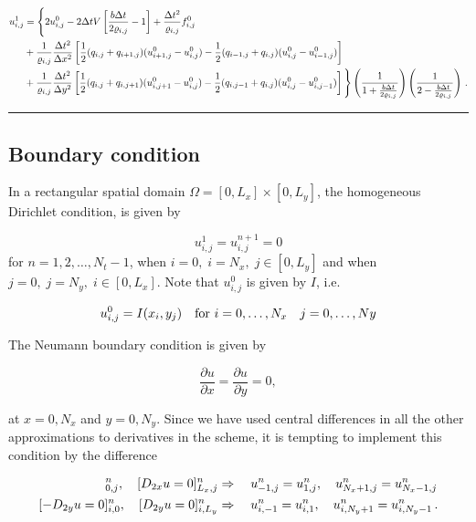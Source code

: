 \documentclass[letterpaper,10pt,english]{/usr/share/sphinx/texinputs/sphinxhowto}
\begin{document}
\begin{align*}
u^{1}_{i,j} &= 
\Bigg\{
2u^{0}_{i,j}  -  2\Delta tV\left[\frac{b \Delta t}{2\varrho_{i,j}} - 1\right]+\frac{\Delta t^2}{\varrho_{i,j}} f^0_{i,j} \\
&+ \frac{1}{\varrho_{i,j}}\frac{\Delta t^2}{\Delta x^2} 
\left[ \frac{1}{2}(q_{i,j} + q_{i+1,j})(u^{0}_{i+1,j} - u^{0}_{i,j}) - \frac{1}{2}(q_{i-1,j} + q_{i,j})(u^{0}_{i,j} - u^{0}_{i-1,j})\right] \\
&+ \frac{1}{\varrho_{i,j}}\frac{\Delta t^2}{\Delta y^2} 
\left[ \frac{1}{2}(q_{i,j} + q_{i,j+1})(u^{0}_{i,j+1} - u^{0}_{i,j}) -\frac{1}{2}(q_{i,j-1} + q_{i,j})(u^{0}_{i,j} - u^{0}_{i,j-1})\right]
\Bigg\} \left(\frac{1}{1+ \frac{b\Delta t}{2\varrho_{i,j} }}\right )\left(\frac{1}{2-\frac{b \Delta t}{2\varrho_{i,j}}} \right)
\thinspace .\end{align*}\begin{center}\rule{3in}{0.4pt}\end{center}

\subsection{Boundary condition}

In a rectangular spatial domain $\Omega = [0,L_x]\times [0,L_y]$, the
homogeneous Dirichlet condition, is given by

\[
u_{i,j}^{1} = u_{i,j}^{n+1} = 0 
\] for $n=1,2,\ldots,N_t-1$, when $i=0, \; i=N_x,\; j \in [0,L_y]$ and
when $j=0,\; j=N_y,\; i \in [0,L_x]$. Note that $u_{i,j}^{0}$ is given
by $I$, i.e.

\[
u_{i,j}^{0} = I(x_i,y_j) \quad \hbox{for   } i=0,\ldots,N_x \quad j=0,\ldots,Ny
\]

The Neumann boundary condition is given by

\begin{equation}
 \frac{\partial u}{\partial x}= \frac{\partial u}{\partial y} = 0,
\end{equation}

at $x = 0, N_x$ and $y = 0, N_y$. Since we have used central differences
in all the other approximations to derivatives in the scheme, it is
tempting to implement this condition by the difference

\begin{align*}
[-D_{2x} u = 0]^n_{0,j},\quad[D_{2x} u = 0]^n_{L_x,j}
&\Rightarrow\quad u^n_{-1,j}=u^n_{1,j}, \quad u^n_{N_x+1,j}=u^n_{N_x-1,j} \\
[-D_{2y} u = 0]^n_{i,0},\quad[D_{2y} u = 0]^n_{i,L_y}
&\Rightarrow\quad u^n_{i,-1}=u^n_{i,1}, \quad u^n_{i,N_y+1}=u^n_{i,N_y-1}
\thinspace .
\end{align*}
\end{document}
